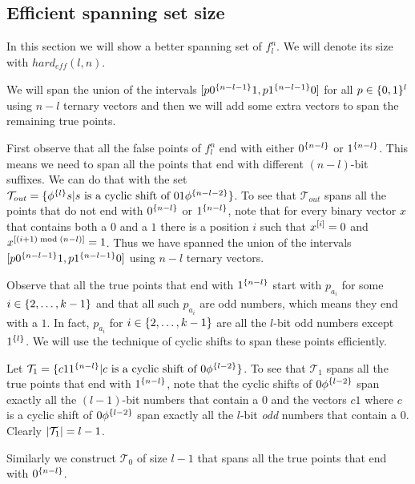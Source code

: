 \subsection{Efficient spanning set size}

In this section we will show a better spanning set
of $f^n_l$.
We will denote its size with
$\mathit{hard}_{\mathit{eff}}(l,n)$.

We will span the union of the intervals
$[p 0^{\{n-l-1\}} 1, p 1^{\{n-l-1\}} 0]$
for all $p \in \{0, 1\}^l$
using $n-l$ ternary vectors
and then we will add some extra vectors
to span the remaining true points.

First observe that all the false points of $f_l^n$
end with either $0^{\{n-l\}}$ or $1^{\{n-l\}}$.
This means we need to span all the points that end
with different $(n-l)$-bit suffixes.
We can do that with the set
$\mathcal{T}_{\mathit{out}}
= \{\phi^{\{l\}} s
| s \text{ is a cyclic shift of } 01 \phi^{\{n-l-2\}}\}$.
To see that $\mathcal{T}_{\mathit{out}}$
spans all the points
that do not end with $0^{\{n-l\}}$ or $1^{\{n-l\}}$,
note that for every binary vector $x$
that contains both a $0$ and a $1$
there is a position $i$
such that $x^{[i]} = 0$
and $x^{[(i+1) \bmod (n-l)]} = 1$.
Thus we have spanned the union of the intervals
$[p 0^{\{n-l-1\}} 1, p 1^{\{n-l-1\}} 0]$
using $n-l$ ternary vectors.

Observe that
all the true points
that end with $1^{\{n-l\}}$
start with $p_{a_i}$
for some $i \in \{2, \ldots, k-1\}$
and that all such $p_{a_i}$ are odd numbers,
which means they end with a $1$.
In fact,
$p_{a_i}$ for $i \in \{2, \ldots, k-1\}$
are all the $l$-bit odd numbers except $1^{\{l\}}$.
We will use the technique of cyclic shifts
to span these points efficiently.

Let $\mathcal{T}_1 = \{c 1 1^{\{n-l\}}
| c \text{ is a cyclic shift of } 0 \phi^{\{l-2\}}\}$.
To see that $\mathcal{T}_1$ spans all the true points
that end with $1^{\{n-l\}}$,
note that the cyclic shifts of $0 \phi^{\{l-2\}}$
span exactly all the $(l-1)$-bit numbers that contain a $0$
and the vectors $c 1$
where $c$ is a cyclic shift of $0 \phi^{\{l-2\}}$
span exactly all the $l$-bit \emph{odd} numbers
that contain a $0$.
Clearly $\lvert\mathcal{T}_1\rvert = l-1$.

Similarly we construct $\mathcal{T}_0$ of size $l-1$
that spans all the true points
that end with $0^{\{n-l\}}$.

